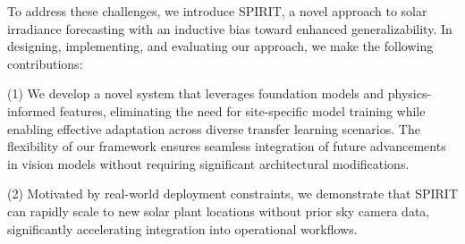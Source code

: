 To address these challenges, we introduce SPIRIT, a novel approach to solar irradiance forecasting with an inductive bias toward enhanced generalizability. In designing, implementing, and evaluating our approach, we make the following contributions:

(1) We develop a novel system that leverages foundation models and physics-informed features, eliminating the need for site-specific model training while enabling effective adaptation across diverse transfer learning scenarios. The flexibility of our framework ensures seamless integration of future advancements in vision models without requiring significant architectural modifications.

(2) Motivated by real-world deployment constraints, we demonstrate that SPIRIT can rapidly scale to new solar plant locations without prior sky camera data, significantly accelerating integration into operational workflows.